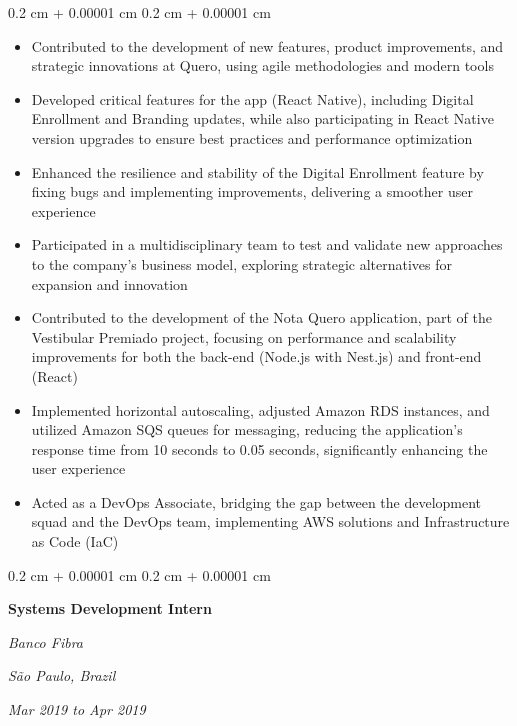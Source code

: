 \documentclass[10pt, a4paper]{article}
\newenvironment{highlights}{
    \begin{itemize}[
        topsep=0.10 cm,
        parsep=0.10 cm,
        partopsep=0pt,
        itemsep=0pt,
        leftmargin=0.4 cm + 10pt
    ]
}{
    \end{itemize}
} %
\newenvironment{onecolentry}{
    \begin{adjustwidth}{
        0.2 cm + 0.00001 cm
    }{
        0.2 cm + 0.00001 cm
    }
}{
    \end{adjustwidth}
} %
\newenvironment{twocolentry}[2][]{
    \onecolentry
    \def\secondColumn{#2}
    \setcolumnwidth{\fill, 7 cm}
    \begin{paracol}{2}
}{
    \switchcolumn \raggedleft \secondColumn
    \end{paracol}
    \endonecolentry
} %
\begin{document}
        \vspace{0.10 cm}
        \begin{onecolentry}
            \begin{highlights}
                \item Contributed to the development of new features, product improvements, and strategic innovations at Quero, using agile methodologies and modern tools
                \item Developed critical features for the app (React Native), including Digital Enrollment and Branding updates, while also participating in React Native version upgrades to ensure best practices and performance optimization
                \item Enhanced the resilience and stability of the Digital Enrollment feature by fixing bugs and implementing improvements, delivering a smoother user experience
                \item Participated in a multidisciplinary team to test and validate new approaches to the company’s business model, exploring strategic alternatives for expansion and innovation
                \item Contributed to the development of the Nota Quero application, part of the Vestibular Premiado project, focusing on performance and scalability improvements for both the back-end (Node.js with Nest.js) and front-end (React)
                \item Implemented horizontal autoscaling, adjusted Amazon RDS instances, and utilized Amazon SQS queues for messaging, reducing the application's response time from 10 seconds to 0.05 seconds, significantly enhancing the user experience
                \item Acted as a DevOps Associate, bridging the gap between the development squad and the DevOps team, implementing AWS solutions and Infrastructure as Code (IaC)
            \end{highlights}
        \end{onecolentry}


        \vspace{0.2 cm}

        \begin{twocolentry}{
        \textit{São Paulo, Brazil}    
            
        \textit{Mar 2019 to Apr 2019}}
            \textbf{Systems Development Intern}
            
            \textit{Banco Fibra}
        \end{twocolentry}
\end{document}
